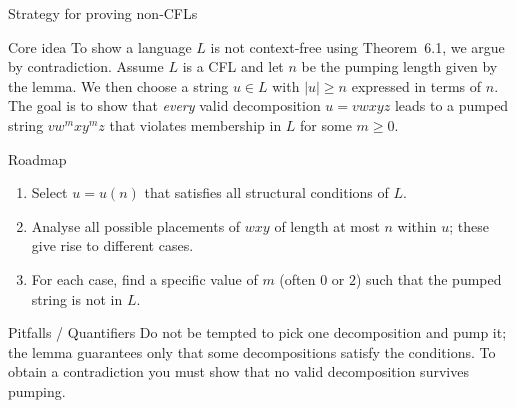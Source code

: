 \begin{frame}[t]{Strategy for proving non‑CFLs}
  \begin{tblock}{Core idea}
    To show a language $L$ is not context‑free using Theorem 6.1, we
    argue by contradiction.  Assume $L$ is a CFL and let $n$ be the
    pumping length given by the lemma.  We then choose a string $u \in L$
    with $|u|\ge n$ expressed in terms of $n$.  The goal is to show that
    \emph{every} valid decomposition $u=v w x y z$ leads to a pumped
    string $v w^m x y^m z$ that violates membership in $L$ for some
    $m\ge 0$.
  \end{tblock}
  \begin{tblock}{Roadmap}
    \begin{enumerate}
      \item Select $u=u(n)$ that satisfies all structural conditions of
        $L$.
      \item Analyse all possible placements of $w x y$ of length at
        most $n$ within $u$; these give rise to different cases.
      \item For each case, find a specific value of $m$ (often $0$ or
        $2$) such that the pumped string is not in $L$.
    \end{enumerate}
  \end{tblock}
  \begin{talert}{Pitfalls / Quantifiers}
    Do not be tempted to pick one decomposition and pump it; the lemma
    guarantees only that some decompositions satisfy the conditions.  To
    obtain a contradiction you must show that no valid decomposition
    survives pumping.
  \end{talert}
  \label{fr:6.1-10}
\end{frame}

